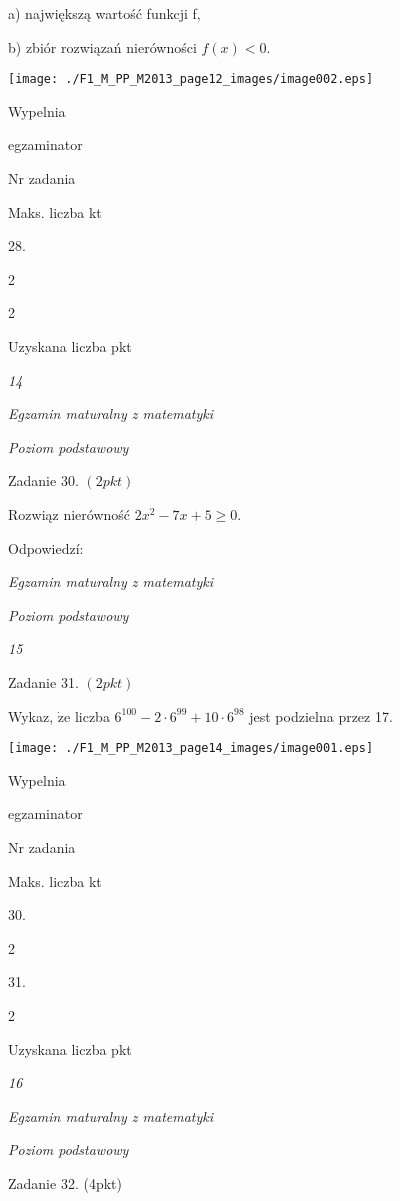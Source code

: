 \documentclass[a4paper,12pt]{article}
\begin{document}
a) największą wartość funkcji f,

b) zbiór rozwiązań nierówności $f(x)<0.$
\begin{center}
\texttt{[image: ./F1\_M\_PP\_M2013\_page12\_images/image002.eps]}
\end{center}
Wypelnia

egzaminator

Nr zadania

Maks. liczba kt

28.

2

2

Uzyskana liczba pkt





{\it 14}

{\it Egzamin maturalny z matematyki}

{\it Poziom podstawowy}

Zadanie 30. $(2pkt)$

Rozwiąz nierówność $2x^{2}-7x+5\geq 0.$

Odpowiedzí:





{\it Egzamin maturalny z matematyki}

{\it Poziom podstawowy}

{\it 15}

Zadanie 31. $(2pkt)$

Wykaz, $\dot{\mathrm{z}}\mathrm{e}$ liczba $6^{100}-2\cdot 6^{99}+10\cdot 6^{98}$ jest podzielna przez 17.
\begin{center}
\texttt{[image: ./F1\_M\_PP\_M2013\_page14\_images/image001.eps]}
\end{center}
Wypelnia

egzaminator

Nr zadania

Maks. liczba kt

30.

2

31.

2

Uzyskana liczba pkt





{\it 16}

{\it Egzamin maturalny z matematyki}

{\it Poziom podstawowy}

Zadanie 32. (4pkt)
\end{document}

